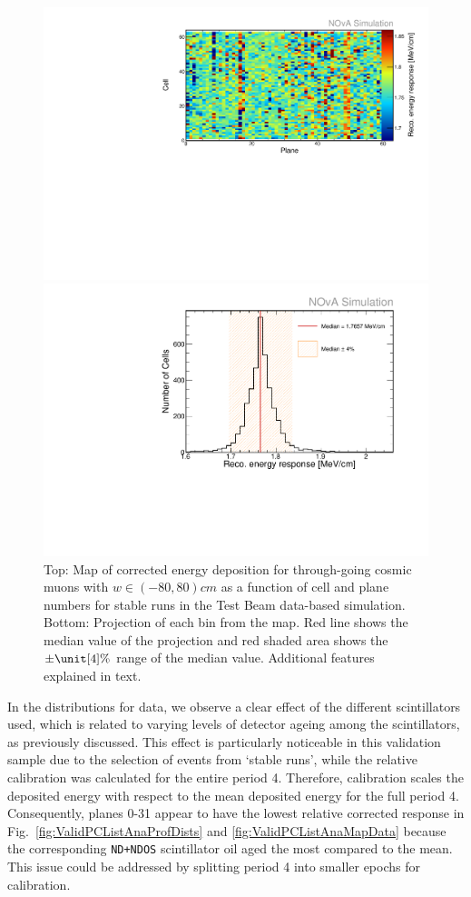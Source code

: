 \begin{figure}[!ht]
  \centering
  \includegraphics[width=0.7\linewidth]{Plots/PCListAna/TBSimulation_CP_recomevcm_ts_zoomed.pdf}
  
  \includegraphics[width=0.7\linewidth]{Plots/PCListAna/Variation_recomevcm_TBSimulation_LimW.pdf}
  \caption[Map of corrected energy deposition for through-going cosmic in simulation]{Top: Map of corrected energy deposition for through-going cosmic muons with $w\in\left(-80,80\right)\unit{cm}$ as a function of cell and plane numbers for stable runs in the Test Beam data-based simulation. Bottom: Projection of each bin from the map. Red line shows the median value of the projection and red shaded area shows the $\pm\unit[4]{\%}$ range of the median value. Additional features explained in text.}
  \label{fig:ValidPCListAnaMapSim}
\end{figure}

In the distributions for data, we observe a clear effect of the different scintillators used, which is related to varying levels of detector ageing among the scintillators, as previously discussed. This effect is particularly noticeable in this validation sample due to the selection of events from `stable runs', while the relative calibration was calculated for the entire period 4. Therefore, calibration scales the deposited energy with respect to the mean deposited energy for the full period 4. Consequently, planes 0-31 appear to have the lowest relative corrected response in Fig.~\ref{fig:ValidPCListAnaProfDists} and \ref{fig:ValidPCListAnaMapData} because the corresponding \texttt{ND+NDOS} scintillator oil aged the most compared to the mean. This issue could be addressed by splitting period 4 into smaller epochs for calibration.

